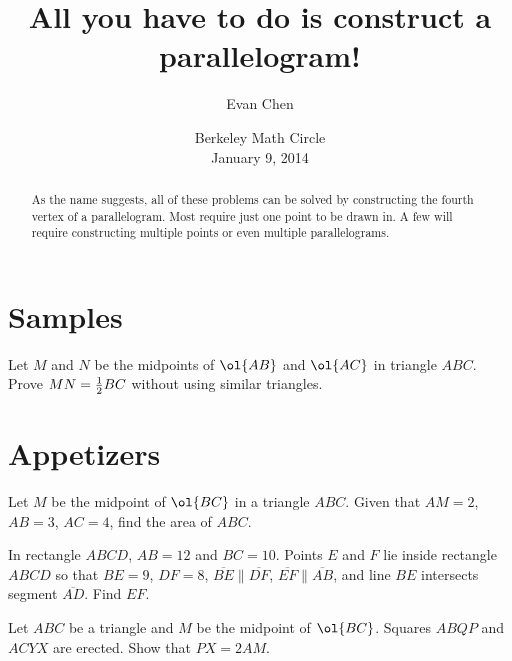 \documentclass[11pt]{scrartcl}
\begin{document}
\title{All you have to do is construct a parallelogram!}
\author{Evan Chen}
\date{Berkeley Math Circle \\ January 9, 2014}
\maketitle

\begin{abstract}
  As the name suggests, all of these problems can be solved by constructing the fourth vertex of a parallelogram. Most require just one point to be drawn in. A few will require constructing multiple points or even multiple parallelograms.
\end{abstract}


\section{Samples}
\begin{problem}
  Let $M$ and $N$ be the midpoints of $\ol{AB}$ and $\ol{AC}$ in triangle $ABC$.  Prove $MN = \frac{1}{2} BC$ without using similar triangles.
\end{problem}



\section{Appetizers}
\begin{problem}
  Let $M$ be the midpoint of $\ol{BC}$ in a triangle $ABC$.  Given that $AM=2$, $AB = 3$, $AC = 4$, find the area of $ABC$.
\end{problem}

\begin{problem}[AIME 2011]
  In rectangle $ABCD$, $AB=12$ and $BC=10$. Points $E$ and $F$ lie inside rectangle $ABCD$ so that $BE=9$, $DF=8$, $\overline{BE} \parallel \overline{DF}$, $\overline{EF} \parallel \overline{AB}$, and line $BE$ intersects segment $\overline{AD}$.  Find $EF$.
\end{problem}

\begin{problem}
  Let $ABC$ be a triangle and $M$ be the midpoint of $\ol{BC}$.  Squares $ABQP$ and $ACYX$ are erected. Show that $PX = 2AM$.
\end{problem}
\end{document}
